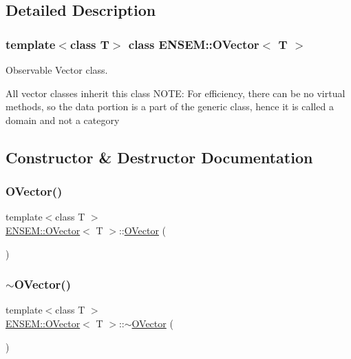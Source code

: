 \subsection{Detailed Description}
\subsubsection*{template$<$class T$>$\newline
class E\+N\+S\+E\+M\+::\+O\+Vector$<$ T $>$}

Observable Vector class. 

All vector classes inherit this class N\+O\+TE\+: For efficiency, there can be no virtual methods, so the data portion is a part of the generic class, hence it is called a domain and not a category 

\subsection{Constructor \& Destructor Documentation}
\mbox{\label{classENSEM_1_1OVector_a49c6719652aea7b411f9ce1e5aa38b18}} 
\subsubsection{\texorpdfstring{OVector()}{OVector()}\hspace{0.1cm}{\footnotesize\ttfamily [1/6]}}
{\footnotesize\ttfamily template$<$class T $>$ \\
\mbox{\hyperlink{classENSEM_1_1OVector}{E\+N\+S\+E\+M\+::\+O\+Vector}}$<$ T $>$\+::\mbox{\hyperlink{classENSEM_1_1OVector}{O\+Vector}} (\begin{DoxyParamCaption}{ }\end{DoxyParamCaption})\hspace{0.3cm}{\ttfamily [inline]}}

\mbox{\label{classENSEM_1_1OVector_adce03257e8042e3ba68c15f88148a83a}} 
\subsubsection{\texorpdfstring{$\sim$OVector()}{~OVector()}\hspace{0.1cm}{\footnotesize\ttfamily [1/2]}}
{\footnotesize\ttfamily template$<$class T $>$ \\
\mbox{\hyperlink{classENSEM_1_1OVector}{E\+N\+S\+E\+M\+::\+O\+Vector}}$<$ T $>$\+::$\sim$\mbox{\hyperlink{classENSEM_1_1OVector}{O\+Vector}} (\begin{DoxyParamCaption}{ }\end{DoxyParamCaption})\hspace{0.3cm}{\ttfamily [inline]}}

